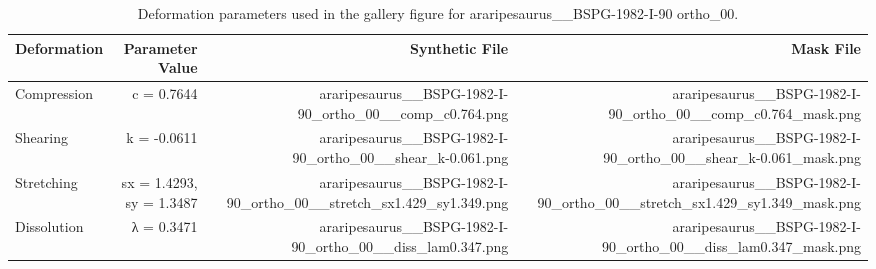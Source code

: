 \begin{table}[htbp]
\caption{Deformation parameters used in the gallery figure for araripesaurus\_\_BSPG-1982-I-90 ortho\_00.}
\label{tab:gallery_params}
\begin{tabular}{lrrr}
\toprule
Deformation & Parameter Value & Synthetic File & Mask File \\
\midrule
Compression & c = 0.7644 & araripesaurus\_\_BSPG-1982-I-90\_ortho\_00\_\_comp\_c0.764.png & araripesaurus\_\_BSPG-1982-I-90\_ortho\_00\_\_comp\_c0.764\_mask.png \\
Shearing & k = -0.0611 & araripesaurus\_\_BSPG-1982-I-90\_ortho\_00\_\_shear\_k-0.061.png & araripesaurus\_\_BSPG-1982-I-90\_ortho\_00\_\_shear\_k-0.061\_mask.png \\
Stretching & sx = 1.4293, sy = 1.3487 & araripesaurus\_\_BSPG-1982-I-90\_ortho\_00\_\_stretch\_sx1.429\_sy1.349.png & araripesaurus\_\_BSPG-1982-I-90\_ortho\_00\_\_stretch\_sx1.429\_sy1.349\_mask.png \\
Dissolution & λ = 0.3471 & araripesaurus\_\_BSPG-1982-I-90\_ortho\_00\_\_diss\_lam0.347.png & araripesaurus\_\_BSPG-1982-I-90\_ortho\_00\_\_diss\_lam0.347\_mask.png \\
\bottomrule
\end{tabular}
\end{table}
